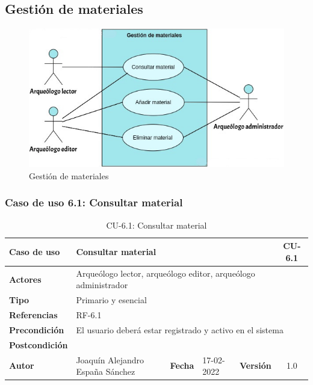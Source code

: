 \subsection{Gestión de materiales}
    \begin{figure}[H]
        \centering
        \includegraphics[scale=0.60]{imagenes/diagramas CU/material-UC.png}
        \caption{Gestión de materiales}
        \label{fig:material-management}
    \end{figure}

\subsubsection{Caso de uso 6.1: Consultar material}

    \begin{table}[H]
    \begin{center}
        \begin{adjustbox}{width=\textwidth}
        \begin{tabular}{ | l | l | l | l | c | c | } 
            \hline
            \textbf{Caso de uso} & \multicolumn{4}{l|}{Consultar material} & \cellcolor{gray!50} \textbf{CU-6.1}\\
            \hline
            \textbf{Actores} & \multicolumn{5}{p{0.9\linewidth}|}{Arqueólogo lector, arqueólogo editor, arqueólogo administrador} \\
            \hline
            \textbf{Tipo} & \multicolumn{5}{l|}{Primario y esencial} \\
            \hline
            \textbf{Referencias} & \multicolumn{3}{l|}{RF-6.1} & \multicolumn{2}{l|}{ }\\
            \hline
            \textbf{Precondición} & \multicolumn{5}{l|}{El usuario deberá estar registrado y activo en el sistema} \\
            \hline
            \textbf{Postcondición} & \multicolumn{5}{l|}{} \\
            \hline
            \textbf{Autor} & \multicolumn{1}{p{0.25\linewidth}|}{Joaquín Alejandro España Sánchez} & \textbf{Fecha} & 
            17-02-2022     & \textbf{Versión}                                                      & 1.0\\
            \hline
        \end{tabular}
        \end{adjustbox}
        \caption{CU-6.1: Consultar material}
        \label{tab:consult-material}
    \end{center}
    \end{table}

